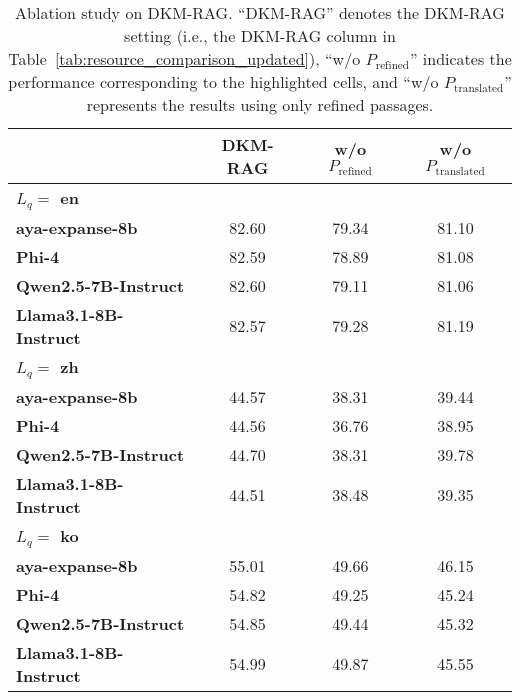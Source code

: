 \begin{table*}[t]
\centering
\renewcommand{\arraystretch}{1.1}
\setlength{\tabcolsep}{10pt}
\begin{tabular}{lccc}
\toprule
 & \textbf{DKM-RAG} & \textbf{w/o $P_{\text{refined}}$} & \textbf{w/o $P_{\text{translated}}$} \\
\midrule
\multicolumn{4}{l}{\textbf{$L_q =$ en}} \\
\midrule
\textbf{aya-expanse-8b}       & 82.60 & 79.34 & 81.10 \\
\textbf{Phi-4}                & 82.59 & 78.89 & 81.08 \\
\textbf{Qwen2.5-7B-Instruct}  & 82.60 & 79.11 & 81.06 \\
\textbf{Llama3.1-8B-Instruct} & 82.57 & 79.28 & 81.19 \\
\midrule
\multicolumn{4}{l}{\textbf{$L_q =$ zh}} \\
\midrule
\textbf{aya-expanse-8b}       & 44.57 & 38.31 & 39.44 \\
\textbf{Phi-4}                & 44.56 & 36.76 & 38.95 \\
\textbf{Qwen2.5-7B-Instruct}  & 44.70 & 38.31 & 39.78 \\
\textbf{Llama3.1-8B-Instruct} & 44.51 & 38.48 & 39.35 \\
\midrule
\multicolumn{4}{l}{\textbf{$L_q =$ ko}} \\
\midrule
\textbf{aya-expanse-8b}       & 55.01 & 49.66 & 46.15 \\
\textbf{Phi-4}                & 54.82 & 49.25 & 45.24 \\
\textbf{Qwen2.5-7B-Instruct}  & 54.85 & 49.44 & 45.32 \\
\textbf{Llama3.1-8B-Instruct} & 54.99 & 49.87 & 45.55 \\
\bottomrule
\end{tabular}
\caption{Ablation study on DKM-RAG. ``DKM-RAG'' denotes the DKM-RAG setting (i.e., the DKM-RAG column in Table~\ref{tab:resource_comparison_updated}), ``w/o $P_{\text{refined}}$'' indicates the performance corresponding to the highlighted cells, and ``w/o $P_{\text{translated}}$'' represents the results using only refined passages.}
\label{tab:ablation_dkm}
\end{table*}
